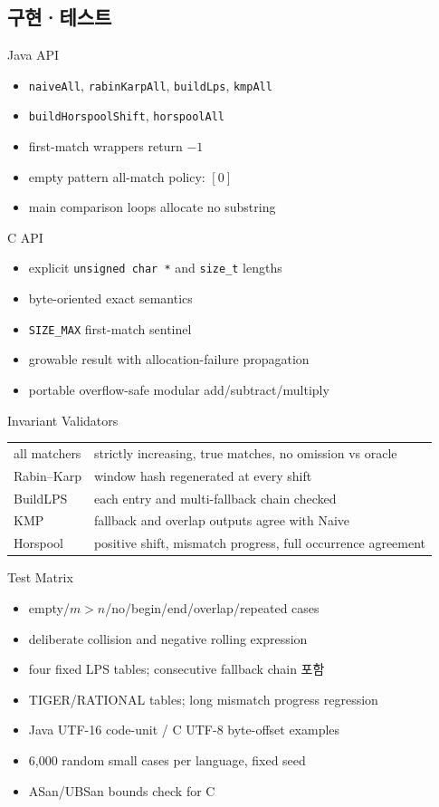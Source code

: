 \subsection{구현·테스트}
\begin{frame}{Java API}
\small\begin{itemize}
\item \texttt{naiveAll}, \texttt{rabinKarpAll}, \texttt{buildLps}, \texttt{kmpAll}
\item \texttt{buildHorspoolShift}, \texttt{horspoolAll}
\item first-match wrappers return \(-1\)
\item empty pattern all-match policy: \([0]\)
\item main comparison loops allocate no substring
\end{itemize}
\end{frame}
\begin{frame}{C API}
\small\begin{itemize}
\item explicit \texttt{unsigned char *} and \texttt{size\_t} lengths
\item byte-oriented exact semantics
\item \texttt{SIZE\_MAX} first-match sentinel
\item growable result with allocation-failure propagation
\item portable overflow-safe modular add/subtract/multiply
\end{itemize}
\end{frame}
\begin{frame}{Invariant Validators}
\small\begin{tabular}{p{.22\linewidth}p{.68\linewidth}}\toprule
all matchers&strictly increasing, true matches, no omission vs oracle\\
Rabin--Karp&window hash regenerated at every shift\\
BuildLPS&each entry and multi-fallback chain checked\\
KMP&fallback and overlap outputs agree with Naive\\
Horspool&positive shift, mismatch progress, full occurrence agreement\\\bottomrule
\end{tabular}
\end{frame}
\begin{frame}{Test Matrix}
\small\begin{itemize}\item empty/\(m>n\)/no/begin/end/overlap/repeated cases\item deliberate collision and negative rolling expression\item four fixed LPS tables; consecutive fallback chain 포함\item TIGER/RATIONAL tables; long mismatch progress regression\item Java UTF-16 code-unit / C UTF-8 byte-offset examples\item 6,000 random small cases per language, fixed seed\item ASan/UBSan bounds check for C\end{itemize}
\end{frame}
